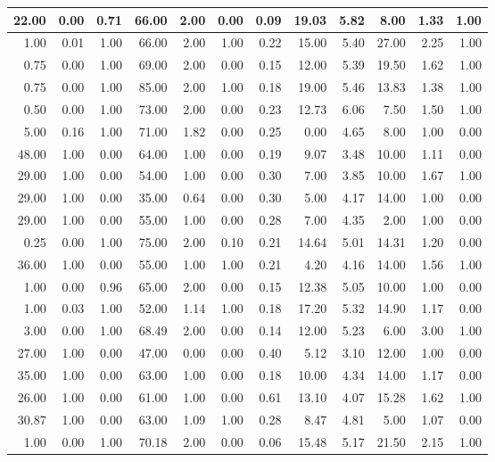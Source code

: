 \documentclass[
]{article}
\begin{document}
\begin{tabular}{r|r|r|r|r|r|r|r|r|r|r|r}
\hline
22.00 & 0.00 & 0.71 & 66.00 & 2.00 & 0.00 & 0.09 & 19.03 & 5.82 & 8.00 & 1.33 & 1.00\\
\hline
1.00 & 0.01 & 1.00 & 66.00 & 2.00 & 1.00 & 0.22 & 15.00 & 5.40 & 27.00 & 2.25 & 1.00\\
\hline
0.75 & 0.00 & 1.00 & 69.00 & 2.00 & 0.00 & 0.15 & 12.00 & 5.39 & 19.50 & 1.62 & 1.00\\
\hline
0.75 & 0.00 & 1.00 & 85.00 & 2.00 & 1.00 & 0.18 & 19.00 & 5.46 & 13.83 & 1.38 & 1.00\\
\hline
0.50 & 0.00 & 1.00 & 73.00 & 2.00 & 0.00 & 0.23 & 12.73 & 6.06 & 7.50 & 1.50 & 1.00\\
\hline
5.00 & 0.16 & 1.00 & 71.00 & 1.82 & 0.00 & 0.25 & 0.00 & 4.65 & 8.00 & 1.00 & 0.00\\
\hline
48.00 & 1.00 & 0.00 & 64.00 & 1.00 & 0.00 & 0.19 & 9.07 & 3.48 & 10.00 & 1.11 & 0.00\\
\hline
29.00 & 1.00 & 0.00 & 54.00 & 1.00 & 0.00 & 0.30 & 7.00 & 3.85 & 10.00 & 1.67 & 1.00\\
\hline
29.00 & 1.00 & 0.00 & 35.00 & 0.64 & 0.00 & 0.30 & 5.00 & 4.17 & 14.00 & 1.00 & 0.00\\
\hline
29.00 & 1.00 & 0.00 & 55.00 & 1.00 & 0.00 & 0.28 & 7.00 & 4.35 & 2.00 & 1.00 & 0.00\\
\hline
0.25 & 0.00 & 1.00 & 75.00 & 2.00 & 0.10 & 0.21 & 14.64 & 5.01 & 14.31 & 1.20 & 0.00\\
\hline
36.00 & 1.00 & 0.00 & 55.00 & 1.00 & 1.00 & 0.21 & 4.20 & 4.16 & 14.00 & 1.56 & 1.00\\
\hline
1.00 & 0.00 & 0.96 & 65.00 & 2.00 & 0.00 & 0.15 & 12.38 & 5.05 & 10.00 & 1.00 & 0.00\\
\hline
1.00 & 0.03 & 1.00 & 52.00 & 1.14 & 1.00 & 0.18 & 17.20 & 5.32 & 14.90 & 1.17 & 0.00\\
\hline
3.00 & 0.00 & 1.00 & 68.49 & 2.00 & 0.00 & 0.14 & 12.00 & 5.23 & 6.00 & 3.00 & 1.00\\
\hline
27.00 & 1.00 & 0.00 & 47.00 & 0.00 & 0.00 & 0.40 & 5.12 & 3.10 & 12.00 & 1.00 & 0.00\\
\hline
35.00 & 1.00 & 0.00 & 63.00 & 1.00 & 0.00 & 0.18 & 10.00 & 4.34 & 14.00 & 1.17 & 0.00\\
\hline
26.00 & 1.00 & 0.00 & 61.00 & 1.00 & 0.00 & 0.61 & 13.10 & 4.07 & 15.28 & 1.62 & 1.00\\
\hline
30.87 & 1.00 & 0.00 & 63.00 & 1.09 & 1.00 & 0.28 & 8.47 & 4.81 & 5.00 & 1.07 & 0.00\\
\hline
1.00 & 0.00 & 1.00 & 70.18 & 2.00 & 0.00 & 0.06 & 15.48 & 5.17 & 21.50 & 2.15 & 1.00\\

\end{tabular}
\end{document}
